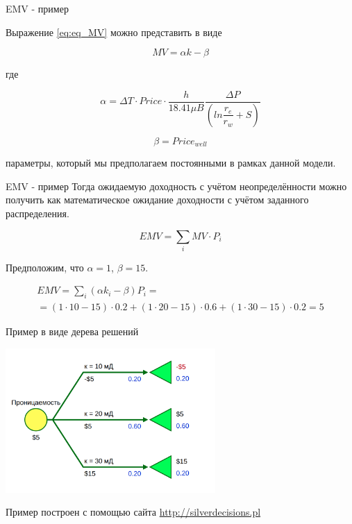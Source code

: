 \begin{frame}{EMV - пример}

	Выражение \ref{eq:eq_MV} можно представить в виде
	
	\begin{equation}
		MV = \alpha k - \beta
		\label{eq:eq_MV_2}
	\end{equation}
	
	где 
	
	$$\alpha =  \Delta T \cdot  Price \cdot \frac{h}{18.41 \mu B} \frac{\Delta P}{  \left( ln\dfrac{r_e}{r_w} + S\right)}
	$$ 
	
	$$
	\beta = Price_{well}
	$$
	
	параметры, который мы предполагаем постоянными в рамках данной модели. 
\end{frame}


\begin{frame}{EMV - пример}
	Тогда ожидаемую доходность с учётом неопределённости можно получить как математическое ожидание доходности с учётом заданного распределения. 
	
	\begin{equation}
		EMV = \sum_{i} MV \cdot P_i 
	\end{equation}
	
	Предположим, что  $\alpha = 1$, $\beta = 15$. 
	
	\begin{multline}
		EMV = \sum_{i} (\alpha k_i - \beta ) P_i = \\
		= (1 \cdot 10 - 15) \cdot 0.2 + (1 \cdot 20 - 15)\cdot 0.6 + (1 \cdot 30 - 15)\cdot 0.2 = 5
	\end{multline}

\end{frame}

\begin{frame}{Пример в виде дерева решений}
	
	\begin{center}
		\includegraphics[width=0.6\textwidth]{pics/EMV_example_silversecision_1}
	\end{center}

	
	Пример построен с помощью сайта \url{http://silverdecisions.pl} 
	
\end{frame}



